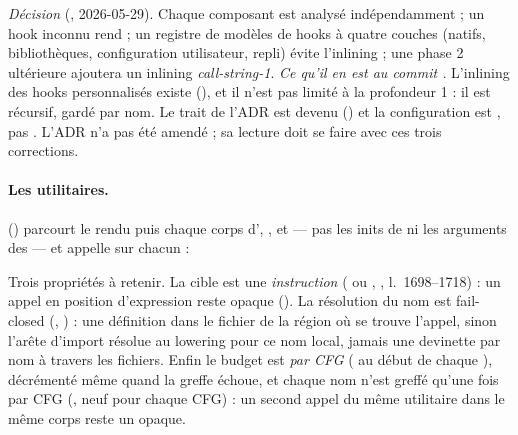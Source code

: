 \begin{decision}
\emph{Décision} (, 2026-05-29). Chaque composant est analysé
indépendamment ; un hook inconnu rend  ; un registre de
modèles de hooks à quatre couches (natifs, bibliothèques, configuration
utilisateur, repli) évite l'inlining ; une phase 2 ultérieure ajoutera un
inlining \emph{call-string-1}. \emph{Ce qu'il en est au commit
\snapshotCommit.} L'inlining des hooks personnalisés existe
(), et il n'est pas limité à la profondeur 1 : il
est récursif, gardé par nom. Le trait  de l'ADR est devenu
 () et la configuration est
, pas . L'ADR n'a pas été
amendé ; sa lecture doit se faire avec ces trois corrections.
\end{decision}

\paragraph{Les utilitaires.} 
() parcourt le rendu puis chaque corps
d', ,  et  --- pas les
inits de  ni les arguments des  --- et appelle
 sur chacun :


Trois propriétés à retenir. La cible est une \emph{instruction}
( ou , ,
l.~1698--1718) : un appel en position d'expression reste opaque
(). La résolution du nom est fail-closed
(, ) :
une définition dans le fichier de la région où se trouve l'appel, sinon
l'arête d'import résolue au lowering pour ce nom local, jamais une devinette
par nom à travers les fichiers. Enfin le budget  est
\emph{par CFG} ( au début de chaque
), décrémenté même quand la greffe échoue, et chaque nom
n'est greffé qu'une fois par CFG (, neuf pour chaque CFG) :
un second appel du même utilitaire dans le même corps reste un 
opaque.

